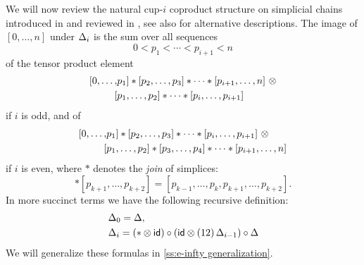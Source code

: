 We will now review the natural cup-$i$ coproduct structure on simplicial chains introduced in \cite[p.293]{steenrod1947products} and reviewed in \cite[p.682]{mcclure2003multivariable}, see also  \cite{gonzalez-diaz1999steenrod, medina2021newformulas} for alternative descriptions.
The image of $[0, \dots, n]$ under $\operatorname{\Delta}_i$ is the sum over all sequences
\begin{equation*}
0 < p_1 < \cdots < p_{i+1} < n
\end{equation*}
of the tensor product element
\begin{equation*}
\begin{split}
[ 0, \dots, &{p_1} ] \ast [ {p_2}, \dots, {p_3} ] \ast \cdots \ast [ {p_{i+1}}, \dots, n ]\ \otimes \\
[ &{p_1}, \dots, {p_2} ] \ast \cdots \ast [ {p_{i}}, \dots, {p_{i+1}} ]
\end{split}
\end{equation*}
if $i$ is odd, and of
\begin{equation*}
\begin{split}
[ 0, \dots, &{p_1} ] \ast [ {p_2}, \dots, {p_3} ] \ast \cdots \ast [ {p_{i}}, \dots, {p_{i+1}} ]\ \otimes \\
[ &{p_1}, \dots, {p_2} ] \ast [ {p_3}, \dots, {p_4} ] \ast \cdots \ast [ {p_{i+1}}, \dots, n ]
\end{split}
\end{equation*}
if $i$ is even, where $\ast$ denotes the \textit{join} of simplices:
\begin{equation*}
[{p_{k-1}}, \dots, {p_{k}} ] \ast [ {p_{k+1}}, \dots, p_{k+2}] = [{p_{k-1}}, \dots, p_k, p_{k+1}, \dots, p_{k+2}].
\end{equation*}
In more succinct terms we have the following recursive definition:
\begin{align*}
& \operatorname{\Delta}_0 = \operatorname{\Delta}, \\
& \operatorname{\Delta}_i =
(\ast \otimes \mathsf{id}) \circ (\mathsf{id} \otimes (12)\operatorname{\Delta}_{i-1}) \circ \operatorname{\Delta}
\end{align*}
We will generalize these formulas in \cref{ss:e-infty generalization}.

